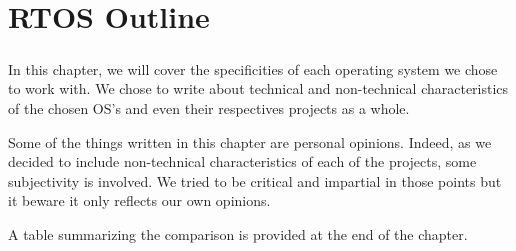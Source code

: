 \chapter{RTOS Outline}

\paragraph{}
In this chapter, we will cover the specificities of each operating system we chose to work with.
We chose to write about technical and non-technical characteristics of the chosen OS's and even their respectives projects as a whole.

Some of the things written in this chapter are personal opinions.
Indeed, as we decided to include non-technical characteristics of each of the projects, some subjectivity is involved.
We tried to be critical and impartial in those points but it beware it only reflects our own opinions.


A table summarizing the comparison is provided at the end of the chapter.





